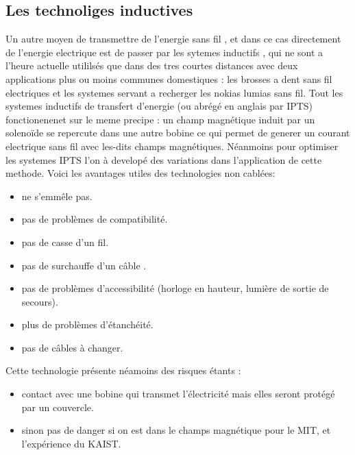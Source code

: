 \documentclass[12pt]{report}
\begin{document}
\subsection{Les technoliges inductives}
  Un autre moyen de transmettre de l'energie sans fil , et dans ce cas directement de l'energie electrique est de passer par les sytemes inductifs , qui ne sont a l'heure actuelle utililsés que dans des tres courtes distances avec deux applications plus ou moins communes domestiques : les brosses a dent sans fil electriques et les systemes servant a recherger les nokias lumias sans fil. Tout les systemes inductifs de transfert d'energie (ou abrégé en anglais par IPTS) fonctionenenet sur le meme precipe : un champ magnétique induit par un solenoïde se repercute dans une autre bobine ce qui permet de generer un courant electrique sans fil avec les-dits champs magnétiques. Néanmoins pour optimiser les systemes IPTS l'on à developé des variations dans l'application de cette methode.
Voici les avantages utiles des technologies non cablées:
\begin{itemize}
	\item ne s'emmêle pas.
	\item pas de problèmes de compatibilité.
	\item pas de casse d'un fil.
	\item pas de surchauffe d'un câble .
	\item pas de problèmes d'accessibilité (horloge en hauteur, lumière de sortie de secours).
	\item plus de problèmes d'étanchéité.
	\item pas de câbles à changer.
\end{itemize}
Cette technologie présente néamoins des risques étants :
\begin{itemize}
	\item contact avec une bobine qui transmet l'électricité mais elles seront protégé par un couvercle.
	\item sinon pas de danger si on est dans le champs magnétique pour le MIT, et l'expérience du KAIST.
\end{itemize}
\end{document}
